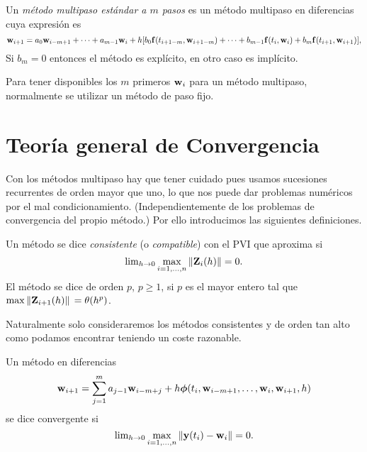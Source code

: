 \begin{definition}
    Un \emph{método multipaso estándar a $m$ pasos}
    es un método multipaso en diferencias cuya expresión es
    \begin{equation*}
        \vb{w}{}_{i+1} = a_0\vb{w}{}_{i-m+1} + \dots + a_{m-1}\vb{w}{}_i + h[
            b_0\vb{f}{}(t_{i+1-m},\vb{w}{}_{i+1-m}) + \dots + b_{m-1}\vb{f}{}(t_i,\vb{w}{}_i)
            + b_m\vb{f}{}(t_{i+1},\vb{w}{}_{i+1})
        ],
    \end{equation*}
    Si $b_m = 0$ entonces el método es explícito, en otro caso es implícito.
\end{definition}

Para tener disponibles los $m$ primeros $\vb{w}{}_i$ para un método multipaso,
normalmente se utilizar un método de paso fijo.

\section{Teoría general de Convergencia}

Con los métodos multipaso hay que tener cuidado pues usamos
sucesiones recurrentes de orden mayor que uno,
lo que nos puede dar problemas numéricos
por el mal condicionamiento.
(Independientemente de los problemas de convergencia del propio método.)
Por ello introducimos las siguientes definiciones.

\begin{definition}
    Un método se dice \emph{consistente} (o \emph{compatible})
    con el PVI que aproxima si
    \begin{equation*}
        \lim\nolimits_{h\to 0} \max_{i = 1,\ldots,n}{\norm{\vb{Z}{}_i(h)}} = 0.
	\end{equation*}
	El método se dice de orden $p$, $p \geq 1$, si $p$ es el mayor entero
	tal que $\max{\norm*{\vb{Z}{}_{i+1}(h)}} = \theta(h^p)$.
\end{definition}

Naturalmente solo consideraremos los métodos consistentes y de orden tan
alto como podamos encontrar teniendo un coste razonable.

\begin{definition}
    Un método en diferencias
    \begin{equation*}
        \vb{w}{}_{i+1} = \sum_{j=1}^m {a_{j-1}\vb{w}{}_{i-m+j}}
            + h\vb*{\phi}{}(t_i,\vb{w}{}_{i-m+1}, \dots, \vb{w}{}_i,\vb{w}{}_{i+1},h)
    \end{equation*}
    se dice convergente si
    \begin{equation*}
        \lim\nolimits_{h \to 0} \max_{i = 1,\ldots,n}{\norm{\vb{y}{}(t_i)-\vb{w}{}_i}} = 0.
    \end{equation*}
\end{definition}

